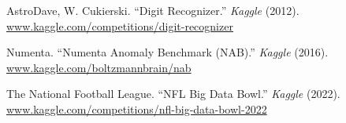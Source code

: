 \begin{thebibliography}{00}
    AstroDave, W. Cukierski.
    ``Digit Recognizer.''
    \textit{Kaggle}
    (2012).
    \url{www.kaggle.com/competitions/digit-recognizer}

    Numenta.
    ``Numenta Anomaly Benchmark (NAB).''
    \textit{Kaggle}
    (2016).
    \url{www.kaggle.com/boltzmannbrain/nab}

    The National Football League.
    ``NFL Big Data Bowl.''
    \textit{Kaggle}
    (2022).
    \url{www.kaggle.com/competitions/nfl-big-data-bowl-2022}

\end{thebibliography}